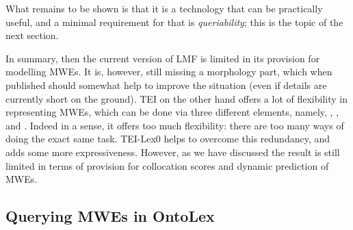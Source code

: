 \documentclass[output=paper,colorlinks,citecolor=brown]{langscibook}
\begin{document}
What remains to be shown is that it is a technology that can be practically useful, and a minimal requirement for that is \emph{queriability}; this is the topic of the next section.

In summary, then the current version of LMF is limited in its provision for modelling MWEs. It is, however, still missing a morphology part, which when published should somewhat help to improve the situation (even if details are currently short on the ground). TEI on the other hand offers a lot of flexibility in representing MWEs, which can be done via three different elements, namely, , , and . Indeed in a sense, it offers too much flexibility: there are too many ways of doing the exact same task. TEI-Lex0 helps to overcome this redundancy, and adds some more expressiveness. However, as we have discussed the result is still limited in terms of provision for collocation scores and dynamic prediction of MWEs.




\subsection{Querying MWEs in OntoLex} %
\label{sec-querying}
\end{document}
